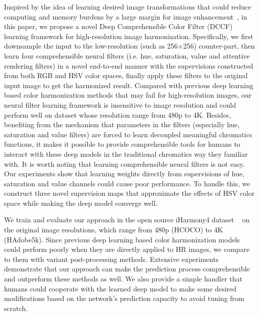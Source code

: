 \documentclass[runningheads]{llncs}
\begin{document}
Inspired by the idea of learning desired image transformations that could reduce computing and memory burdens by a large margin for image enhancement~\cite{gharbi2017deep}, in this paper, 
    we propose a novel Deep Comprehensible Color Filter (DCCF) learning framework for high-resolution image harmonization.
    Specifically, we first downsample the input to the low-resolution (such as 256$\times$256) counter-part, then learn four comprehensible neural filters (i.e. hue, saturation, value and attentive rendering filters) in a novel end-to-end manner with the supervisions constructed from both RGB and HSV color spaces, finally apply these filters to the original input image to get the harmonized result.
    Compared with previous deep learning based color harmonization methods that may fail for high-resolution images, our neural filter learning framework is insensitive to image resolution and could perform well on dataset whose resolution range from 480p to 4K.
    Besides, benefiting from the mechanism that parameters in the filters (especially hue, saturation and value filters) are forced to learn decoupled meaningful chromatics functions, it makes it possible to
    provide comprehensible tools for humans to interact with these deep models in the traditional chromatics way they familiar with.
It is worth noting that learning comprehensible neural filters is not easy.
    Our experiments show that learning weights directly from supervisions of hue, saturation and value channels could cause poor performance.
    To handle this, we construct three novel supervision maps that approximate the effects of HSV color space while making the deep model converge well.


    We train and evaluate our approach in the open source iHarmony4 dataset ~\cite{cong2020dovenet} on the original image resolutions, which range from 480p (HCOCO) to 4K (HAdobe5k).
    Since previous deep learning based color harmonization models could perform poorly when they are directly applied to HR images, we compare to them with variant post-processing methods.
    Extensive experiments demonstrate that our approach can make the prediction process comprehensible and outperform these methods as well.
We also provide a simple handler that humans could cooperate with the learned deep model to make some desired modifications based on the network's prediction capacity to avoid tuning from scratch. 
    
\end{document}
